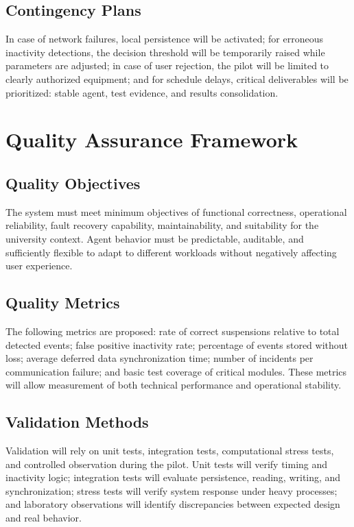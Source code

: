 \documentclass[12pt,a4paper]{article}
\begin{document}
\subsection{Contingency Plans}
In case of network failures, local persistence will be activated; for erroneous inactivity detections, the decision threshold will be temporarily raised while parameters are adjusted; in case of user rejection, the pilot will be limited to clearly authorized equipment; and for schedule delays, critical deliverables will be prioritized: stable agent, test evidence, and results consolidation.

\section{Quality Assurance Framework}

\subsection{Quality Objectives}
The system must meet minimum objectives of functional correctness, operational reliability, fault recovery capability, maintainability, and suitability for the university context. Agent behavior must be predictable, auditable, and sufficiently flexible to adapt to different workloads without negatively affecting user experience.

\subsection{Quality Metrics}
The following metrics are proposed: rate of correct suspensions relative to total detected events; false positive inactivity rate; percentage of events stored without loss; average deferred data synchronization time; number of incidents per communication failure; and basic test coverage of critical modules. These metrics will allow measurement of both technical performance and operational stability.

\subsection{Validation Methods}
Validation will rely on unit tests, integration tests, computational stress tests, and controlled observation during the pilot. Unit tests will verify timing and inactivity logic; integration tests will evaluate persistence, reading, writing, and synchronization; stress tests will verify system response under heavy processes; and laboratory observations will identify discrepancies between expected design and real behavior.
\end{document}
